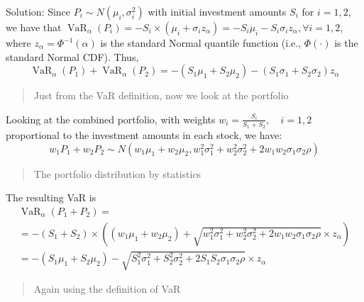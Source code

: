 \documentclass[
  oneside]{book}
\begin{document}
Solution: Since \(P_i \sim N\left(\mu_i, \sigma_i^2\right)\) with initial investment amounts \(S_i\) for \(i=1,2\), we have that \(\operatorname{VaR}_\alpha\left(P_i\right)=-S_i \times\left(\mu_i+\sigma_i z_\alpha\right)=-S_i \mu_i-S_i \sigma_i z_\alpha, \forall i=1,2\), where \(z_\alpha=\Phi^{-1}(\alpha)\) is the standard Normal quantile function (i.e., \(\Phi(\cdot)\) is the standard Normal CDF). Thus,
\[
\operatorname{VaR}_\alpha\left(P_1\right)+\operatorname{VaR}_\alpha\left(P_2\right)=-\left(S_1 \mu_1+S_2 \mu_2\right)-\left(S_1 \sigma_1+S_2 \sigma_2\right) z_\alpha
\]

\begin{quote}
Just from the VaR definition, now we look at the portfolio
\end{quote}

Looking at the combined portfolio, with weights \(w_i=\frac{S_i}{S_1+S_2}, \quad i=1,2\) proportional to the investment amounts in each stock, we have:
\[
w_1 P_1+w_2 P_2 \sim N\left(w_1 \mu_1+w_2 \mu_2, w_1^2 \sigma_1^2+w_2^2 \sigma_2^2+2 w_1 w_2 \sigma_1 \sigma_2 \rho\right)
\]

\begin{quote}
The portfolio distribution by statistics
\end{quote}

The resulting VaR is
\[
\begin{gathered}
\operatorname{VaR}_\alpha\left(P_1+P_2\right)= \\
=-\left(S_1+S_2\right) \times\left(\left(w_1 \mu_1+w_2 \mu_2\right)+\sqrt{w_1^2 \sigma_1^2+w_2^2 \sigma_2^2+2 w_1 w_2 \sigma_1 \sigma_2 \rho} \times z_\alpha\right) \\
=-\left(S_1 \mu_1+S_2 \mu_2\right)-\sqrt{S_1^2 \sigma_1^2+S_2^2 \sigma_2^2+2 S_1 S_2 \sigma_1 \sigma_2 \rho} \times z_\alpha
\end{gathered}
\]

\begin{quote}
Again using the definition of VaR
\end{quote}
\end{document}
